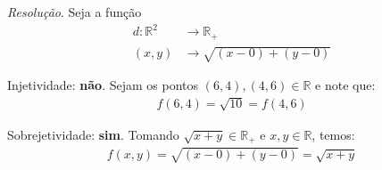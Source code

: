 \emph{Resolução}. Seja a função
\begin{align*}
    d: \mathbb{R}^2 &\rightarrow \mathbb{R}_+ \\
    (x, y) &\rightarrow \sqrt{(x - 0) + (y - 0)}
\end{align*}
\par Injetividade: \textbf{não}. Sejam os pontos $(6, 4), (4,6) \in \mathbb{R}$ e note que:
    \begin{align*}
        f(6,4) = \sqrt{10} = f(4,6)
    \end{align*}
\par Sobrejetividade: \textbf{sim}. Tomando $\sqrt{x + y} \in \mathbb{R}_+$ e $x, y \in \mathbb{R}$, temos:
    \begin{align*}
        f(x, y) = \sqrt{(x - 0) + (y - 0)} = \sqrt{x + y}
    \end{align*}